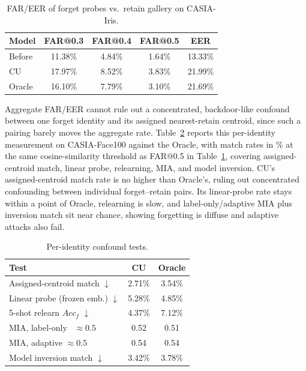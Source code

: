 \begin{table}[htbp]
\centering
\small
\setlength{\tabcolsep}{4pt}

\begin{tabular}{l|c|c|c|c}
\toprule
Model & FAR@0.3 & FAR@0.4 & FAR@0.5 & EER \\
\midrule
Before & 11.38\% & 4.84\% & 1.64\% & 13.33\% \\
\rowcolor{orange!10}
CU & 17.97\% & 8.52\% & 3.83\% & 21.99\% \\
Oracle & 16.10\% & 7.79\% & 3.10\% & 21.69\% \\
\bottomrule
\end{tabular}
\vspace{0.03cm}
\caption{FAR/EER of forget probes vs.\ retain gallery on CASIA-Iris.}
\label{tab:far_eer}
\end{table}

\vspace{0.02cm}
\noindent
Aggregate FAR/EER cannot rule out a concentrated, backdoor-like confound between one forget identity and its assigned nearest-retain centroid, since such a pairing barely moves the aggregate rate. Table~\ref{tab:assigned_centroid} reports this per-identity measurement on CASIA-Face100 against the Oracle, with match rates in \% at the same cosine-similarity threshold as FAR@0.5 in Table~\ref{tab:far_eer}, covering assigned-centroid match, linear probe, relearning, MIA, and model inversion. CU's assigned-centroid match rate is no higher than Oracle's, ruling out concentrated confounding between individual forget--retain pairs. Its linear-probe rate stays within a point of Oracle, relearning is slow, and label-only/adaptive MIA plus inversion match sit near chance, showing forgetting is diffuse and adaptive attacks also fail.

\begin{table}[htbp]
\centering
\scriptsize
\setlength{\tabcolsep}{3pt}
\begin{tabular}{l|c|c}
\toprule
\textbf{Test} & \textbf{CU} & \textbf{Oracle} \\
\midrule
Assigned-centroid match $\downarrow$ & 2.71\% & 3.54\% \\
\midrule
\rowcolor{orange!10}
Linear probe (frozen emb.) $\downarrow$ & 5.28\% & 4.85\% \\
5-shot relearn $Acc_f$ $\downarrow$ & 4.37\% & 7.12\% \\
\midrule
MIA, label-only~\cite{choquette2021label} $\approx\!0.5$ & 0.52 & 0.51 \\
\rowcolor{orange!10}
MIA, adaptive $\approx\!0.5$ & 0.54 & 0.54 \\
Model inversion match $\downarrow$ & 3.42\% & 3.78\% \\
\bottomrule
\end{tabular}
\vspace{0.03cm}
\caption{Per-identity confound tests.}
\label{tab:assigned_centroid}
\end{table}

